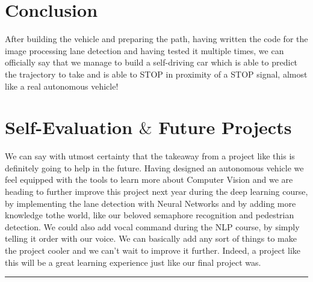 \documentclass[12pt,a4paper]{article}
\begin{document}
\begin{large}
\section{Conclusion}
After building the vehicle and preparing the path, having written the code for the image processing lane detection and having tested it multiple times,  we can officially say that we manage to build a self-driving car which is able to predict the trajectory to take and is able to STOP in proximity of a STOP signal, almost like a real autonomous vehicle! \\


\section{Self-Evaluation $\&$ Future Projects}
We can say with utmost certainty that the takeaway from a project like this is definitely going to help in the future. Having designed an autonomous vehicle we feel equipped with the tools to learn more about Computer Vision and we are heading to further improve this project next year during the deep learning course, by implementing the lane detection with Neural Networks and by adding more knowledge tothe world, like our beloved semaphore recognition and pedestrian detection. We could also add vocal command during the NLP course, by simply telling it order with our voice. We can basically add any sort of things to make the project cooler and we can't wait to improve it further. Indeed, a project like this will be a great learning experience just like our final project was. \\

\noindent\rule{18.5cm}{0.4pt}
\end{large} 
\end{document}
